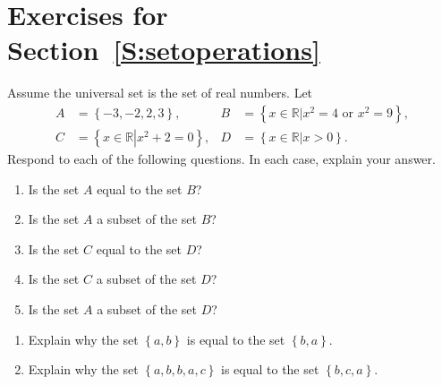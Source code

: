 \section*{Exercises for Section~\ref{S:setoperations}}
%
\begin{enumerate}
\xitem Assume the universal set is the set of real numbers.  Let \label{exer:sec41-1}
\begin{align*}
A &= \left\{ { - 3, - 2,2,3} \right\}\!, &	B &= \left\{ {\left. {x \in \mathbb{R}} \right|x^2  = 4\text{  or  }x^2  = 9} \right\}\!,  \\
C &= \left\{ {x \in \mathbb{R}\left.  \right|x^2  + 2 = 0} \right\}\!,  &	D &= \left\{ {x \in \mathbb{R}\left.  \right|x > 0} \right\}\!.
\end{align*}
Respond to each of the following questions.  In each case, explain your answer.
\begin{enumerate}
  \item Is the set  $A$  equal to the set  $B$?
  \item Is the set  $A$  a subset of the set  $B$?
  \item Is the set  $C$  equal to the set  $D$?
  \item Is the set  $C$  a subset of the set  $D$?
  \item Is the set  $A$  a subset of the set  $D$?
\end{enumerate}

\xitem \label{exer41-equalsets}
\begin{enumerate} \item Explain why the set  $\left\{ {a,b} \right\}$  is equal to the set  $\left\{ {b,a} \right\}$. 
  \item Explain why the set  $\left\{ {a,b,b,a,c} \right\}$ is equal to the set  $\left\{ {b,c,a} \right\}$.
\end{enumerate}


\end{enumerate}
